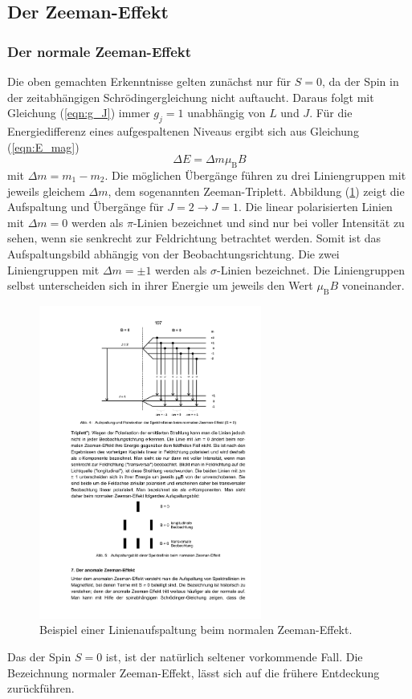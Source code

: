 \subsection{Der Zeeman-Effekt}

\subsubsection{Der normale Zeeman-Effekt}
Die oben gemachten Erkenntnisse gelten zunächst nur für $S=0$, da der Spin in der
zeitabhängigen Schrödingergleichung nicht auftaucht.
Daraus folgt mit Gleichung (\ref{eqn:g_J}) immer $g_j=1$ unabhängig von $L$ und $J$.
Für die Energiedifferenz eines aufgespaltenen Niveaus ergibt sich aus
Gleichung (\ref{eqn:E_mag})
\begin{equation}
    \Delta E=\Delta m\mu_{\mathup{B}}B
    \label{eqn:dE_norm}
\end{equation}
mit $\Delta m=m_1-m_2$. Die möglichen Übergänge führen zu drei Liniengruppen mit
jeweils gleichem $\Delta m$, dem sogenannten Zeeman-Triplett.
Abbildung (\ref{fig:zeeman_normal}) zeigt die Aufspaltung und Übergänge für
$J=2\rightarrow J=1$.
Die linear polarisierten Linien mit $\Delta m=0$ werden als $\pi$-Linien bezeichnet und sind nur
bei voller Intensität zu sehen, wenn sie senkrecht zur Feldrichtung betrachtet werden.
Somit ist das Aufspaltungsbild abhängig von der Beobachtungsrichtung.
Die zwei Liniengruppen mit $\Delta m=\pm1$ werden als $\sigma$-Linien bezeichnet.
Die Liniengruppen selbst unterscheiden sich in ihrer Energie um jeweils den Wert
$\mu_{\mathup{B}}B$ voneinander.
\begin{figure}
    \centering
    \includegraphics[width=0.65\textwidth]{graphics/zeeman_normal.pdf}
    \caption{Beispiel einer Linienaufspaltung beim normalen Zeeman-Effekt.}
    \label{fig:zeeman_normal}
\end{figure}
Das der Spin $S=0$ ist, ist der natürlich seltener vorkommende Fall. Die Bezeichnung
normaler Zeeman-Effekt, lässt sich auf die frühere Entdeckung zurückführen.

